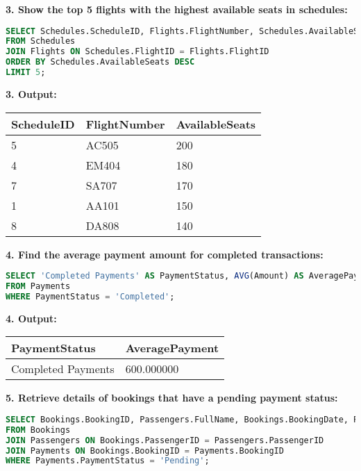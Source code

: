 \documentclass[14pt,a4paper]{extarticle}
\begin{document}
    \textbf{3. Show the top 5 flights with the highest available seats in schedules:}
    \begin{lstlisting}[language=SQL, upquote=true]
SELECT Schedules.ScheduleID, Flights.FlightNumber, Schedules.AvailableSeats
FROM Schedules
JOIN Flights ON Schedules.FlightID = Flights.FlightID
ORDER BY Schedules.AvailableSeats DESC
LIMIT 5;
    \end{lstlisting}
    
    \textbf{3. Output:}
\begin{table}[h!]
\centering
\begin{tabular}{|l|l|l|}
\hline
\textbf{ScheduleID} & \textbf{FlightNumber} & \textbf{AvailableSeats} \\ \hline
5                   & AC505                 & 200                     \\ \hline
4                   & EM404                 & 180                     \\ \hline
7                   & SA707                 & 170                     \\ \hline
1                   & AA101                 & 150                     \\ \hline
8                   & DA808                 & 140                     \\ \hline
\end{tabular}
\end{table}

    \textbf{4. Find the average payment amount for completed transactions:}
    \begin{lstlisting}[language=SQL, upquote=true]
SELECT 'Completed Payments' AS PaymentStatus, AVG(Amount) AS AveragePayment
FROM Payments
WHERE PaymentStatus = 'Completed';
    \end{lstlisting}
    
    \textbf{4. Output:}
\begin{table}[h!]
\centering
\begin{tabular}{|l|l|}
\hline
\textbf{PaymentStatus}      & \textbf{AveragePayment} \\ \hline
Completed Payments          & 600.000000             \\ \hline
\end{tabular}
\end{table}

\newpage

    \textbf{5. Retrieve details of bookings that have a pending payment status:}
    \begin{lstlisting}[language=SQL, upquote=true]
SELECT Bookings.BookingID, Passengers.FullName, Bookings.BookingDate, Payments.PaymentStatus
FROM Bookings
JOIN Passengers ON Bookings.PassengerID = Passengers.PassengerID
JOIN Payments ON Bookings.BookingID = Payments.BookingID
WHERE Payments.PaymentStatus = 'Pending';
    \end{lstlisting}
\end{document}
